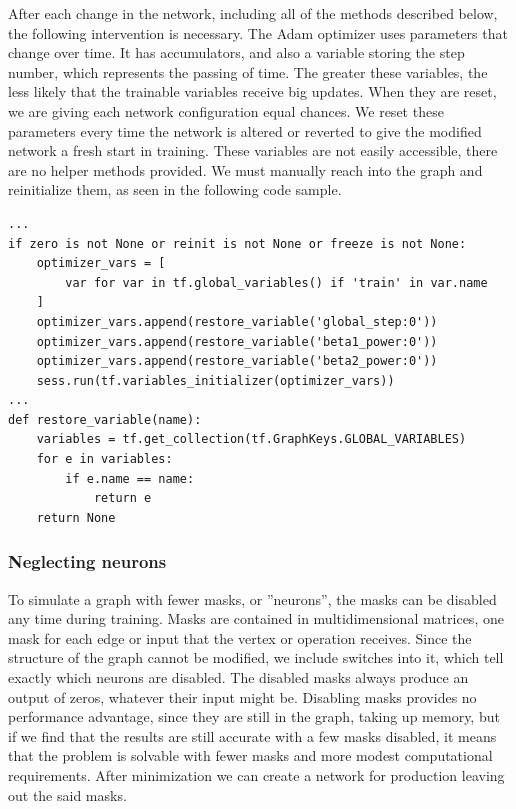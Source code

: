 \documentclass[12pt]{report}
\begin{document}
After each change in the network, including all of the methods described below, the following intervention is necessary. The Adam \cite{adam} optimizer uses parameters that change over time. It has accumulators, and also a variable storing the step number, which represents the passing of time. The greater these variables, the less likely that the trainable variables receive big updates. When they are reset, we are giving each network configuration equal chances. We reset these parameters every time the network is altered or reverted to give the modified network a fresh start in training. These variables are not easily accessible, there are no helper methods provided. We must manually reach into the graph and reinitialize them, as seen in the following code sample.
\begin{center}
	\begin{minipage}{0.95\textwidth}
		\begin{lstlisting}[title=fcn\_train.py]
...
if zero is not None or reinit is not None or freeze is not None:
	optimizer_vars = [
		var for var in tf.global_variables() if 'train' in var.name
	]
	optimizer_vars.append(restore_variable('global_step:0'))
	optimizer_vars.append(restore_variable('beta1_power:0'))
	optimizer_vars.append(restore_variable('beta2_power:0'))
	sess.run(tf.variables_initializer(optimizer_vars))
...
def restore_variable(name):
	variables = tf.get_collection(tf.GraphKeys.GLOBAL_VARIABLES)
	for e in variables:
		if e.name == name:
			return e
	return None
		\end{lstlisting}
	\end{minipage}
\end{center}
\subsubsection{Neglecting neurons}
To simulate a graph with fewer masks, or ''neurons'', the masks can be disabled any time during training. Masks are contained in multidimensional matrices, one mask for each edge or input that the vertex or operation receives. Since the structure of the graph cannot be modified, we include switches into it, which tell exactly which neurons are disabled. The disabled masks always produce an output of zeros, whatever their input might be. Disabling masks provides no performance advantage, since they are still in the graph, taking up memory, but if we find that the results are still accurate with a few masks disabled, it means that the problem is solvable with fewer masks and more modest computational requirements. After minimization we can create a network for production leaving out the said masks.
\end{document}
